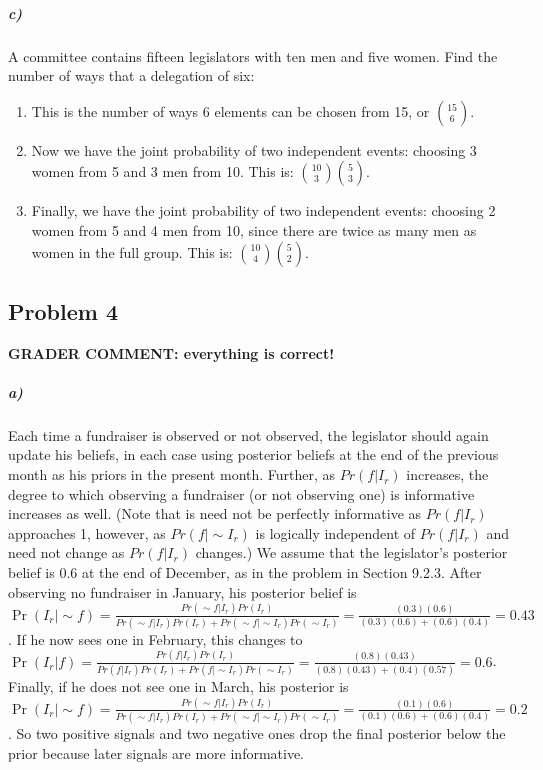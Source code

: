 \documentclass[12pt,letter]{article}\usepackage[]{graphicx}\usepackage[]{color}
\begin{document}
\subparagraph{c)} A committee contains fifteen legislators with ten men and five women. Find the number of ways that a delegation of six:
\begin{enumerate}
	\item This is the number of ways 6 elements can be chosen from 15, or ${15}\choose{6}$. %
	\item Now we have the joint probability of two independent events: choosing 3 women from 5 and 3 men from 10. This is: ${{10}\choose{3}} {{5}\choose{3}}$. %
	\item Finally, we have the joint probability of two independent events: choosing 2 women from 5 and 4 men from 10, since there are twice as many men as women in the full group. This is: ${{10}\choose{4}} {{5}\choose{2}}$. %
\end{enumerate}

\pagebreak

\subsection*{Problem 4}

\textbf{\color{red} GRADER COMMENT: everything is correct!}

\subparagraph{a)} Each time a fundraiser is observed or not observed, the legislator should again update his beliefs, in each case using posterior beliefs at the end of the previous month as his priors in the present month. Further, as $Pr(f|I_r)$ increases, the degree to which observing a fundraiser (or not observing one) is informative increases as well. (Note that is need not be perfectly informative as $Pr(f|I_r)$ approaches 1, however, as $Pr(f|\sim I_r)$ is logically independent of $Pr(f|I_r)$ and need not change as $Pr(f|I_r)$ changes.) We assume that the legislator's posterior belief is $0.6$ at the end of December, as in the problem in Section 9.2.3.  After observing no fundraiser in January, his posterior belief is $\Pr(I_r|\sim f)=\frac{Pr(\sim f|I_r)Pr(I_r)}{Pr(\sim f|I_r)Pr(I_r)+Pr(\sim f|\sim I_r)Pr(\sim I_r)}=\frac{(0.3)(0.6)}{(0.3)(0.6)+(0.6)(0.4)}=0.43$. If he now sees one in February, this changes to $\Pr(I_r|f)=\frac{Pr(f|I_r)Pr(I_r)}{Pr(f|I_r)Pr(I_r)+Pr(f|\sim I_r)Pr(\sim I_r)}=\frac{(0.8)(0.43)}{(0.8)(0.43)+(0.4)(0.57)}=0.6$. Finally, if he does not see one in March, his posterior is $\Pr(I_r|\sim f)=\frac{Pr(\sim f|I_r)Pr(I_r)}{Pr(\sim f|I_r)Pr(I_r)+Pr(\sim f|\sim I_r)Pr(\sim I_r)}=\frac{(0.1)(0.6)}{(0.1)(0.6)+(0.6)(0.4)}=0.2$. So two positive signals and two negative ones drop the final posterior below the prior because later signals are more informative.
\end{document}
